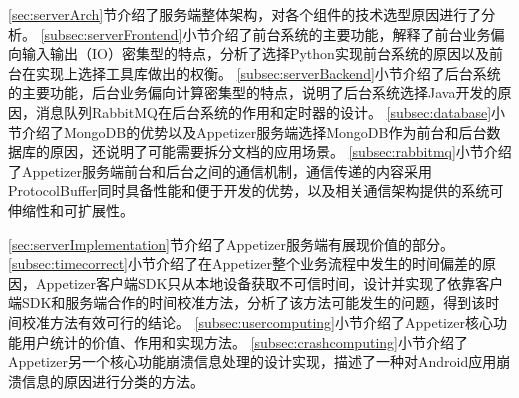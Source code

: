 \ref{sec:serverArch}节介绍了服务端整体架构，对各个组件的技术选型原因进行了分析。
\ref{subsec:serverFrontend}小节介绍了前台系统的主要功能，解释了前台业务偏向输入输出（IO）密集型的特点，分析了选择Python实现前台系统的原因以及前台在实现上选择工具库做出的权衡。
\ref{subsec:serverBackend}小节介绍了后台系统的主要功能，后台业务偏向计算密集型的特点，说明了后台系统选择Java开发的原因，消息队列RabbitMQ在后台系统的作用和定时器的设计。
\ref{subsec:database}小节介绍了MongoDB的优势以及Appetizer服务端选择MongoDB作为前台和后台数据库的原因，还说明了可能需要拆分文档的应用场景。
\ref{subsec:rabbitmq}小节介绍了Appetizer服务端前台和后台之间的通信机制，通信传递的内容采用ProtocolBuffer同时具备性能和便于开发的优势，以及相关通信架构提供的系统可伸缩性和可扩展性。

\ref{sec:serverImplementation}节介绍了Appetizer服务端有展现价值的部分。
\ref{subsec:timecorrect}小节介绍了在Appetizer整个业务流程中发生的时间偏差的原因，Appetizer客户端SDK只从本地设备获取不可信时间，设计并实现了依靠客户端SDK和服务端合作的时间校准方法，分析了该方法可能发生的问题，得到该时间校准方法有效可行的结论。
\ref{subsec:usercomputing}小节介绍了Appetizer核心功能用户统计的价值、作用和实现方法。
\ref{subsec:crashcomputing}小节介绍了Appetizer另一个核心功能崩溃信息处理的设计实现，描述了一种对Android应用崩溃信息的原因进行分类的方法。
